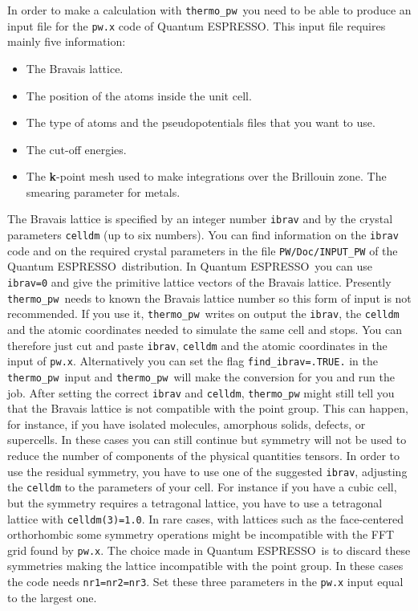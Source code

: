 \documentclass[12pt,a4paper]{article}
\def\qe{{\sc Quantum ESPRESSO}}
\def\thermo{\texttt{thermo\_pw}}
\begin{document}
In order to make a calculation with \thermo\ you need to be able to 
produce an input file for the \texttt{pw.x} code of \qe. This input file
requires mainly five information:
\begin{itemize}
\item The Bravais lattice.

\item The position of the atoms inside the unit cell.

\item The type of atoms and the pseudopotentials files that you want to use.

\item The cut-off energies.

\item The {\bf k}-point mesh used to make integrations over
the Brillouin zone. The smearing parameter for metals. 
\end{itemize}

The Bravais lattice is specified by an integer number \texttt{ibrav} and by the
crystal parameters \texttt{celldm} (up to six numbers). You can find 
information on the \texttt{ibrav} code and on the required crystal parameters
in the file \texttt{PW/Doc/INPUT\_PW} of the \qe\ distribution. 
In \qe\ you can use \texttt{ibrav=0} and give the primitive
lattice vectors of the Bravais lattice. Presently \thermo\ needs to
known the Bravais lattice number so this form of input is not recommended. 
If you use it, \thermo\ writes on output the \texttt{ibrav}, the 
\texttt{celldm} and the atomic coordinates needed to simulate
the same cell and stops.
You can therefore just cut and paste \texttt{ibrav}, \texttt{celldm} 
and the atomic coordinates in the input of \texttt{pw.x}. Alternatively
you can set the flag \texttt{find\_ibrav=.TRUE.} in the \thermo\ input
and \thermo\ will make the conversion for you and run the job. 
After setting the correct
\texttt{ibrav} and \texttt{celldm}, \texttt{thermo\_pw} might still tell you
that the Bravais lattice is not compatible with the point group. This
can happen, for instance, if you have isolated molecules, amorphous solids,
defects, or supercells. In these cases you can still continue but symmetry 
will not be 
used to reduce the number of components of the physical quantities tensors. 
In order to use the residual symmetry, you have to
use one of the suggested \texttt{ibrav}, adjusting the \texttt{celldm} to
the parameters of your cell. For instance if you have a cubic cell, but
the symmetry requires a tetragonal lattice, you have to use a tetragonal
lattice with \texttt{celldm(3)=1.0}.
In rare cases, with lattices such as the face-centered orthorhombic some
symmetry operations might be incompatible with the FFT grid found by 
\texttt{pw.x}. The choice made in \qe\ is to discard these symmetries making
the lattice incompatible with the point group. In these cases the code needs 
\texttt{nr1=nr2=nr3}. Set these three parameters in the \texttt{pw.x} input 
equal to the largest one. 
\end{document}

